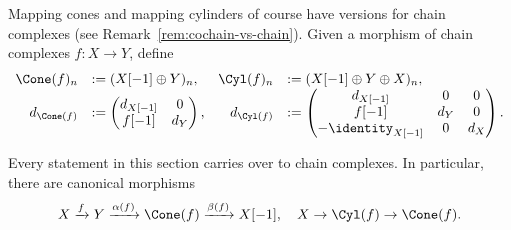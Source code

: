 \begin{remark}\label{rem:cone-chain}
	Mapping cones and mapping cylinders of course have versions for chain
	complexes (see Remark~\ref{rem:cochain-vs-chain}). Given a morphism of
	chain complexes $f:X\to Y$, define
	\[\begin{array}{rlrl}
		\Cone(f)_n & :=(X[-1] \oplus Y)_n, &
		\Cyl(f)_n & := (X[-1] \oplus Y \oplus X)_n, \\
		d_{\Cone(f)} & := \begin{pmatrix} d_{X[-1]} & 0 \\ f[-1] & d_Y \end{pmatrix}, &
		d_{\Cyl(f)} & := \begin{pmatrix} d_{X[-1]} & 0 & 0 \\ f[-1] & d_Y & 0 \\ -\identity_{X[-1]} & 0 & d_X \end{pmatrix}.
	\end{array}\]

	Every statement in this section carries over to chain complexes. In
	particular, there are canonical morphisms
	\[ X \xrightarrow{f} Y \xrightarrow{\alpha(f)} \Cone(f) \xrightarrow{\beta(f)} X[-1], \quad X \to \Cyl(f) \to \Cone(f). \]
\end{remark}
